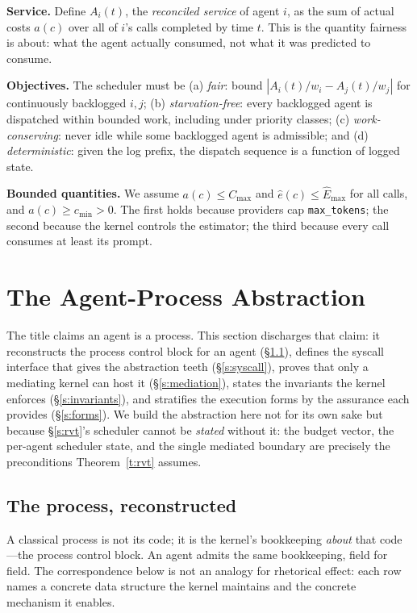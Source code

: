 \documentclass[letterpaper,11pt,leqno]{article}
\begin{document}
\textbf{Service.} Define $A_i(t)$, the \emph{reconciled service} of agent $i$, as the sum of actual costs $a(c)$ over all of $i$'s calls completed by time $t$. This is the quantity fairness is about: what the agent actually consumed, not what it was predicted to consume.

\textbf{Objectives.} The scheduler must be (a) \emph{fair}: bound $|A_i(t)/w_i - A_j(t)/w_j|$ for continuously backlogged $i, j$; (b) \emph{starvation-free}: every backlogged agent is dispatched within bounded work, including under priority classes; (c) \emph{work-conserving}: never idle while some backlogged agent is admissible; and (d) \emph{deterministic}: given the log prefix, the dispatch sequence is a function of logged state.

\textbf{Bounded quantities.} We assume $a(c) \le C_{\max}$ and $\hat{e}(c) \le \hat{E}_{\max}$ for all calls, and $a(c) \ge c_{\min} > 0$. The first holds because providers cap \texttt{max\_tokens}; the second because the kernel controls the estimator; the third because every call consumes at least its prompt.

\section{The Agent-Process Abstraction}\label{s:process}

The title claims an agent is a process. This section discharges that claim: it reconstructs the process control block for an agent (\S\ref{s:pcb}), defines the syscall interface that gives the abstraction teeth (\S\ref{s:syscall}), proves that only a mediating kernel can host it (\S\ref{s:mediation}), states the invariants the kernel enforces (\S\ref{s:invariants}), and stratifies the execution forms by the assurance each provides (\S\ref{s:forms}). We build the abstraction here not for its own sake but because \S\ref{s:rvt}'s scheduler cannot be \emph{stated} without it: the budget vector, the per-agent scheduler state, and the single mediated boundary are precisely the preconditions Theorem~\ref{t:rvt} assumes.

\subsection{The process, reconstructed}\label{s:pcb}

A classical process is not its code; it is the kernel's bookkeeping \emph{about} that code---the process control block. An agent admits the same bookkeeping, field for field. The correspondence below is not an analogy for rhetorical effect: each row names a concrete data structure the kernel maintains and the concrete mechanism it enables.
\end{document}
